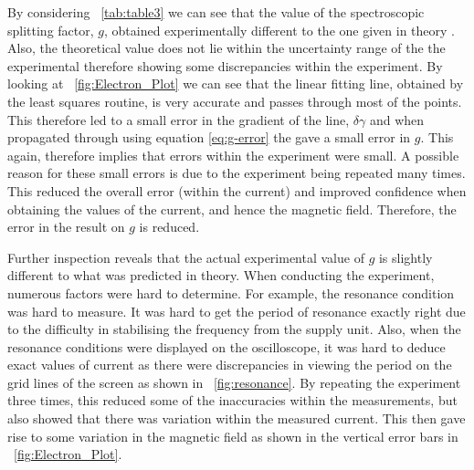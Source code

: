 \documentclass{article}
\newcommand{\figref}[2][\figurename~]{#1\ref{#2}}
\newcommand{\tabref}[2][\tablename~]{#1\ref{#2}}
\begin{document}
\vspace{2mm}
\noindent
By considering \tabref{tab:table3} we can see that the value of the spectroscopic splitting factor, $g$, obtained experimentally different to the one given in theory \cite{Paper02}. Also, the theoretical value does not lie within the uncertainty range of the the experimental therefore showing some discrepancies within the experiment. By looking at \figref{fig:Electron_Plot} we can see that the linear fitting line, obtained by the least squares routine, is very accurate and passes through most of the points. This therefore led to a small error in the gradient of the line, $\delta\gamma$ and when propagated through using equation \eqref{eq:g-error} the gave a small error in $g$. This again, therefore implies that errors within the experiment were small. A possible reason for these small errors is due to the experiment being repeated many times. This reduced the overall error (within the current) and improved confidence when obtaining the values of the current, and hence the magnetic field. Therefore, the error in the result on $g$ is reduced. 

\vspace{2mm}
\noindent
Further inspection reveals that the actual experimental value of $g$ is slightly different to what was predicted in theory. When conducting the experiment, numerous factors were hard to determine. For example, the resonance condition was hard to measure. It was hard to get the period of resonance exactly right due to the difficulty in stabilising the frequency from the supply unit. Also, when the resonance conditions were displayed on the oscilloscope, it was hard to deduce exact values of current as there were discrepancies in viewing the period on the grid lines of the screen as shown in \figref{fig:resonance}. By repeating the experiment three times, this reduced some of the inaccuracies within the measurements, but also showed that there was variation within the measured current. This then gave rise to some variation in the magnetic field as shown in the vertical error bars in \figref{fig:Electron_Plot}. 
\end{document}
